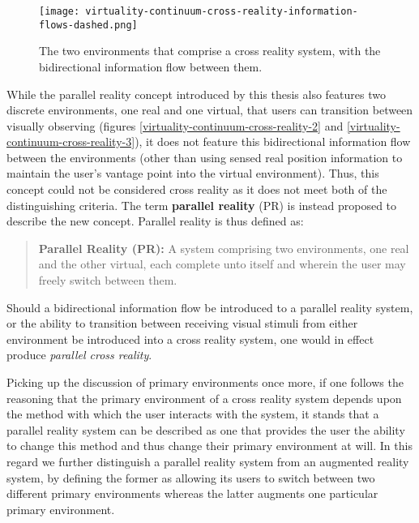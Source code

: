 \begin{figure}[h]
	\begin{center}
		\texttt{[image: virtuality-continuum-cross-reality-information-flows-dashed.png]}
		\caption{The two environments that comprise a cross reality system, with the bidirectional information flow between them.}
		\label{virtuality-continuum-cross-reality-information-flows-dashed.png}
	\end{center}
\end{figure}

While the parallel reality concept introduced by this thesis also features two discrete environments, one real and one virtual, that users can transition between visually observing (figures \ref{virtuality-continuum-cross-reality-2} and \ref{virtuality-continuum-cross-reality-3}), it does not feature this bidirectional information flow between the environments (other than using sensed real position information to maintain the user's vantage point into the virtual environment). Thus, this concept could not be considered cross reality as it does not meet both of the distinguishing criteria. The term \textbf{parallel reality} (PR) is instead proposed to describe the new concept. Parallel reality is thus defined as:

\begin{quote}
	\textbf{Parallel Reality (PR):} A system comprising two environments, one real and the other virtual, each complete unto itself and wherein the user may freely switch between them.
\end{quote}

Should a bidirectional information flow be introduced to a parallel reality system, or the ability to transition between receiving visual stimuli from either environment be introduced into a cross reality system, one would in effect produce \textit{parallel cross reality}.

Picking up the discussion of primary environments once more, if one follows the reasoning that the primary environment of a cross reality system depends upon the method with which the user interacts with the system, it stands that a parallel reality system can be described as one that provides the user the ability to change this method and thus change their primary environment at will. In this regard we further distinguish a parallel reality system from an augmented reality system, by defining the former as allowing its users to switch between two different primary environments whereas the latter augments one particular primary environment.

